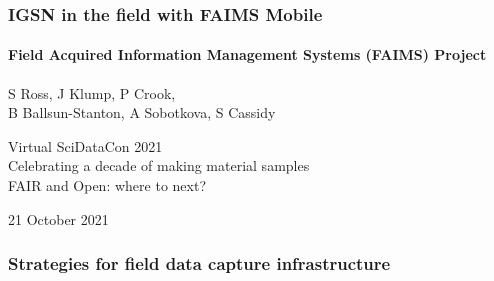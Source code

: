 \documentclass[
	aspectratio=169, %
	12pt, %
	t, %
]{beamer}
\begin{document}
\begin{refsegment}




\begin{titleframe} %
	\frametitle{IGSN in the field with FAIMS Mobile}
	\framesubtitle{Field Acquired Information Management Systems (FAIMS) Project}

	S Ross, J Klump, P Crook, \\B Ballsun-Stanton, A Sobotkova, S Cassidy
    
    \medskip
    
    Virtual SciDataCon 2021\\
	Celebrating a decade of making material samples\\ FAIR and Open: where to next?
	
	\medskip
	
	21 October 2021
	
\end{titleframe}





\begin{frame}
    \frametitle{Strategies for field data capture infrastructure}
    

\end{frame}
\end{refsegment}
\end{document}
